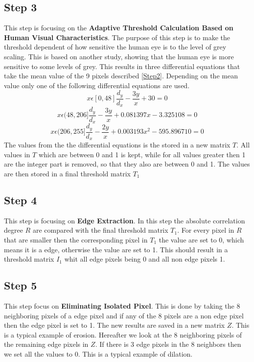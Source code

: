 \subsection{Step 3}
\label{Step3}
This step is focusing on the \textbf{Adaptive Threshold Calculation Based on
Human Visual Characteristics}. The purpose of this step is to make the threshold dependent of how sensitive the human eye is to the level of grey scaling. This is based on another study, showing that the human eye is more sensitive to some levels of grey. This results in three differential equations that take the mean value of the 9 pixels described \autoref{Step2}. Depending on the mean value only one of the following differential equations are used.
\begin{equation}
x\epsilon[0,48]  \frac{d_y}{d_x}-\frac{3y}{x}+30=0
\end{equation}
\begin{equation}
x\epsilon(48,206]  \frac{d_y}{d_x}-\frac{3y}{x}+0.081397x-3.325108=0
\end{equation}
\begin{equation}
x\epsilon(206,255]  \frac{d_y}{d_x}-\frac{2y}{x}+0.003193x^2 -595.896710=0
\end{equation}
The values from the the differential equations is the stored in a new matrix $T$. All values in $T$ which are between 0 and 1 is kept, while for all values greater then 1 are the integer part is removed, so that they also are between 0 and 1. The values are then stored in a final threshold matrix $T_1$ 

\subsection{Step 4}
\label{Step4}
This step is focusing on \textbf{Edge Extraction}. In this step the absolute correlation degree $R$ are compared with the final threshold matrix $T_1$. For every pixel in $R$ that are smaller then the corresponding pixel in $T_1$ the value are set to 0, which means it is a edge, otherwise the value are set to 1. This should result in a threshold matrix $I_1$ whit all edge pixels being 0 and all non edge pixels 1.

\subsection{Step 5}
\label{Step5}
This step focus on \textbf{Eliminating Isolated Pixel}. This is done by taking the 8 neighboring pixels of a edge pixel and if any of the 8 pixels are a non edge pixel then the edge pixel is set to 1. The new results are saved in a new matrix $Z$. This is a typical example of erosion. Hereafter we look at the 8 neighboring pixels of the remaining edge pixels in $Z$. If there is 3 edge pixels in the 8 neighbors then we set all the values to 0. This is a typical example of dilation.

\newpage

